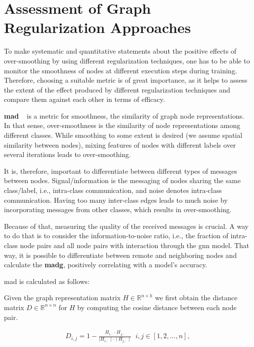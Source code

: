 \section{Assessment of Graph Regularization Approaches}
\label{sec:related:setup:choice:metrics}
To make systematic and quantitative statements about the positive effects of over-smoothing by using different regularization techniques, one has to be able to monitor the smoothness of nodes at different execution steps during training.
Therefore, choosing a suitable metric is of great importance, as it helps to assess the extent of the effect produced by different regularization techniques and compare them against each other in terms of efficacy.

\textbf{\Ac{mad}} ~\cite{Chen2020} is a metric for smoothness, the similarity of graph node representations.
In that sense, over-smoothness is the similarity of node representations among different classes.
While smoothing to some extent is desired (we assume spatial similarity between nodes), mixing features of nodes with different labels over several iterations leads to over-smoothing.

It is, therefore, important to differentiate between different types of messages between nodes.
Signal/information is the messaging of nodes sharing the same class/label, i.e., intra-class communication, and noise denotes intra-class communication.
Having too many inter-class edges leads to much noise by incorporating messages from other classes, which results in over-smoothing.

Because of that, measuring the quality of the received messages is crucial.
A way to do that is to consider the information-to-noise ratio, i.e., the fraction of intra-class node pairs and all node pairs with interaction through the \ac{gnn} model.
That way, it is possible to differentiate between remote and neighboring nodes and calculate the \textbf{\ac{madg}}, positively correlating with a model's accuracy.

\ac{mad} is calculated as follows:

Given the graph representation matrix $H \in \mathbb{R}^{n \times h}$ we
first obtain the distance matrix $D \in \mathbb{R}^{n \times n}$ for $H$ by
computing the cosine distance between each node pair.

\begin{align*}
    D_{i,j} = 1 - \frac{H_{i,:} \cdot H_{j,:}}{\mid H_{i,:}\mid  \cdot \mid H_{j,:}\mid} \; \;  i,j \in [1,2, \dots, n],
\end{align*}

